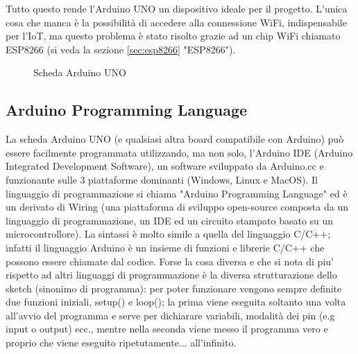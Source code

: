 \documentclass[12pt]{report}
\begin{document}
Tutto questo rende l'Arduino UNO un dispositivo ideale per il progetto. L'unica cosa che manca è la possibilità di accedere alla connessione WiFi, indispensabile per l'IoT, ma questo problema è stato risolto grazie ad un chip WiFi chiamato ESP8266 (si veda la sezione \ref{sec:esp8266} "ESP8266").

\begin{figure}
	\caption{Scheda Arduino UNO}
	\label{fig:uno}
\end{figure}

%
\subsection{Arduino Programming Language}
%

La scheda Arduino UNO (e qualsiasi altra board compatibile con Arduino) può essere facilmente programmata utilizzando, ma non solo, l'Arduino IDE (Arduino Integrated Development Software), un software sviluppato da Arduino.cc e funzionante sulle 3 piattaforme dominanti (Windows, Linux e MacOS). Il linguaggio di programmazione si chiama "Arduino Programming Language"\cite{sistemi_embedded_atrent} ed è un derivato di Wiring (una piattaforma di sviluppo open-source composta da un linguaggio di programmazione, un IDE ed un circuito stampato basato su un microcontrollore). La sintassi è molto simile a quella del linguaggio C/C++; infatti il linguaggio Arduino è un insieme di funzioni e librerie C/C++ che possono essere chiamate dal codice. Forse la cosa diversa e che si nota di piu' rispetto ad altri linguaggi di programmazione è la diversa strutturazione dello sketch (sinonimo di programma): per poter funzionare vengono sempre definite due funzioni iniziali, setup() e loop(); la prima viene eseguita soltanto una volta all'avvio del programma e serve per dichiarare variabili, modalità dei pin (e.g input o output) ecc., mentre nella seconda viene messo il programma vero e proprio che viene eseguito ripetutamente... all'infinito.
\end{document}

